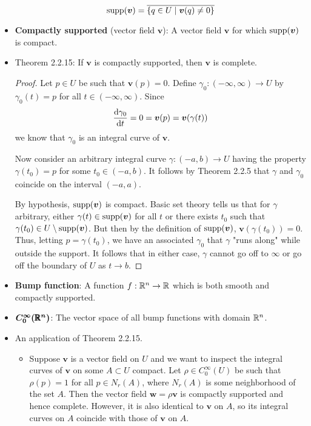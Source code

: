 \documentclass[../notes.tex]{subfiles}
\begin{document}
\begin{itemize}
\begin{equation*}
        \operatorname{supp}(\bm{v}) = \overline{\{q\in U\mid\bm{v}(q)\neq 0\}}
    \end{equation*}
    \item \textbf{Compactly supported} (vector field $\bm{v}$): A vector field $\bm{v}$ for which $\operatorname{supp}(\bm{v})$ is compact.
    \item Theorem 2.2.15: If $\bm{v}$ is compactly supported, then $\bm{v}$ is complete.
    \begin{proof}
        Let $p\in U$ be such that $\bm{v}(p)=0$. Define $\gamma_0:(-\infty,\infty)\to U$ by $\gamma_0(t)=p$ for all $t\in(-\infty,\infty)$. Since
        \begin{equation*}
            \dv{\gamma_0}{t} = 0 = \bm{v}(p) = \bm{v}(\gamma(t))
        \end{equation*}
        we know that $\gamma_0$ is an integral curve of $\bm{v}$.\par
        Now consider an arbitrary integral curve $\gamma:(-a,b)\to U$ having the property $\gamma(t_0)=p$ for some $t_0\in(-a,b)$. It follows by Theorem 2.2.5 that $\gamma$ and $\gamma_0$ coincide on the interval $(-a,a)$.\par
        By hypothesis, $\operatorname{supp}(\bm{v})$ is compact. Basic set theory tells us that for $\gamma$ arbitrary, either $\gamma(t)\in\operatorname{supp}(\bm{v})$ for all $t$ or there exists $t_0$ such that $\gamma(t_0)\in U\setminus\operatorname{supp}(\bm{v})$. But then by the definition of $\operatorname{supp}(\bm{v})$, $\bm{v}(\gamma(t_0))=0$. Thus, letting $p=\gamma(t_0)$, we have an associated $\gamma_0$ that $\gamma$ "runs along" while outside the support. It follows that in either case, $\gamma$ cannot go off to $\infty$ or go off the boundary of $U$ as $t\to b$.
    \end{proof}
    \item \textbf{Bump function}: A function $f:\mathbb{R}^n\to\mathbb{R}$ which is both smooth and compactly supported.
    \item $\bm{C_0^\infty(\pmb{\mathbb{R}}^n)}$: The vector space of all bump functions with domain $\mathbb{R}^n$.
    \item An application of Theorem 2.2.15.
    \begin{itemize}
        \item Suppose $\bm{v}$ is a vector field on $U$ and we want to inspect the integral curves of $\bm{v}$ on some $A\subset U$ compact. Let $\rho\in C_0^\infty(U)$ be such that $\rho(p)=1$ for all $p\in N_r(A)$, where $N_r(A)$ is some neighborhood of the set $A$. Then the vector field $\bm{w}=\rho\bm{v}$ is compactly supported and hence complete. However, it is also identical to $\bm{v}$ on $A$, so its integral curves on $A$ coincide with those of $\bm{v}$ on $A$.

\end{itemize}
\end{itemize}
\end{document}
